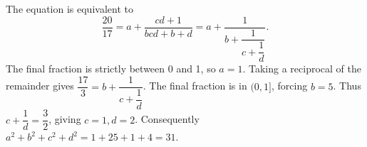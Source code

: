 The equation is equivalent to
\[\dfrac{20}{17}=a+\dfrac{cd+1}{bcd+b+d}=a+\dfrac{1}{b+\dfrac{1}{c+\dfrac{1}{d}}}.\]
The final fraction is strictly between 0 and 1, so $a=1$. Taking a reciprocal of the remainder gives $\dfrac{17}{3}=b+\dfrac{1}{c+\dfrac{1}{d}}$. The final fraction is in $(0,1]$, forcing $b=5$. Thus $c+\dfrac{1}{d}=\dfrac{3}{2}$, giving $c=1,d=2$. Consequently $a^2+b^2+c^2+d^2=1+25+1+4=\boxed{31}$.
